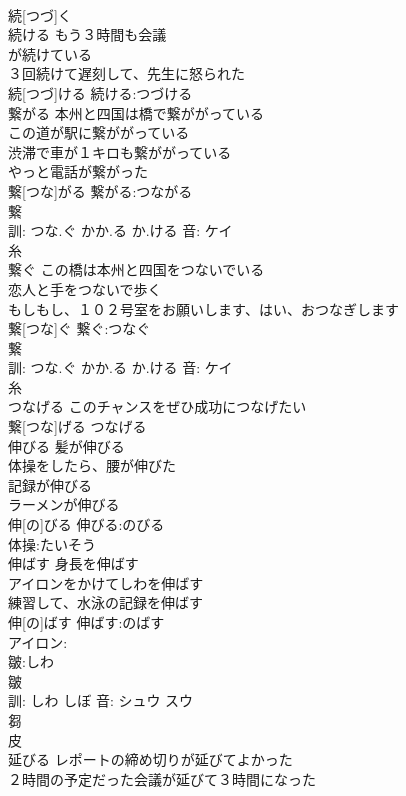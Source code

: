 \documentclass[8pt]{extreport}
\begin{document}
\begin{CJK}{UTF8}{min}
\\	続[つづ]く						
\\	続ける	もう３時間も会議
\\	が続けている 
\\	３回続けて遅刻して、先生に怒られた 
\\	続[つづ]ける			続ける:つづける
\\	繋がる	本州と四国は橋で繋ががっている 
\\	この道が駅に繋ががっている 
\\	渋滞で車が１キロも繋ががっている 
\\	やっと電話が繋がった 
\\	繋[つな]がる			繋がる:つながる
\\	繋 
\\	訓: つな.ぐ かか.る か.ける 音: ケイ 
\\	糸 
\\	繋ぐ	この橋は本州と四国をつないでいる 
\\	恋人と手をつないで歩く 
\\	もしもし、１０２号室をお願いします、はい、おつなぎします 
\\	繋[つな]ぐ			繋ぐ:つなぐ
\\	繋 
\\	訓: つな.ぐ かか.る か.ける 音: ケイ 
\\	糸 
\\	つなげる	このチャンスをぜひ成功につなげたい 
\\	繋[つな]げる			つなげる 
\\	伸びる	髪が伸びる 
\\	体操をしたら、腰が伸びた 
\\	記録が伸びる 
\\	ラーメンが伸びる 
\\	伸[の]びる			伸びる:のびる
\\	体操:たいそう
\\	伸ばす	身長を伸ばす 
\\	アイロンをかけてしわを伸ばす 
\\	練習して、水泳の記録を伸ばす 
\\	伸[の]ばす			伸ばす:のばす
\\	アイロン:
\\	皺:しわ
\\	皺 
\\	訓: しわ しぼ 音: シュウ スウ 
\\	芻 
\\	皮 
\\	延びる	レポートの締め切りが延びてよかった 
\\	２時間の予定だった会議が延びて３時間になった 

\end{CJK}
\end{document}
